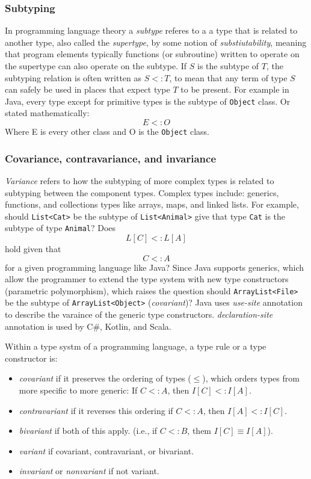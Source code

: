 \documentclass[a4paper]{article}
\begin{document}
\subsubsection*{Subtyping}

In programming language theory a \emph{subtype} referes to a a type that is related to another type, also called the 
\emph{supertype}, by some notion of \emph{substiutability}, meaning that program elements typically functions (or subroutine)
written to operate on the supertype can also operate on the subtype. If \(S\) is the subtype of \(T\), the subtyping relation
is often written as \(S <: T\), to mean that any term of type \(S\) can safely be used in places that expect type \(T\) to be
present. For example in Java, every type except for primitive types is the subtype of \lstinline{Object} class. Or stated
mathematically:
\[
E <: O  
\]
Where E is every other class and O is the \lstinline{Object} class. 

\subsubsection*{Covariance, contravariance, and invariance}
\emph{Variance} refers to how the subtyping of more complex types is related to subtyping between the component types.
Complex types include: generics, functions, and collections types like arrays, maps, and linked lists. For example, 
should \lstinline{List<Cat>} be the subtype of \lstinline{List<Animal>} give that type \lstinline{Cat} is the subtype of type \lstinline{Animal}? Does
\[L[C] <: L[A]\] hold given that \[C <: A\] for a given programming language like Java? Since Java supports generics, which
allow the programmer to extend the type system with new type constructors (parametric polymorphism), which raises the question
should \lstinline{ArrayList<File>} be the subtype of \lstinline{ArrayList<Object>} (\emph{covariant})? Java uses 
\emph{use-site}  annotation to describe the varaince of the generic type constructors. \emph{declaration-site} annotation is
used by C\#, Kotlin, and Scala. 

Within a type systm of a programming language, a type rule or a type constructor is:

\begin{itemize}
    \item \emph{covariant} if it preserves the ordering of types (\(\leq\)), which orders types from more specific to more
          generic: If \(C <: A\), then \(I[C] <: I[A]\).
    \item \emph{contravariant} if it reverses this ordering if \(C <: A\), then \(I[A] <: I[C]\).
    \item \emph{bivariant} if both of this apply. (i.e., if \(C <: B\), them \(I[C] \equiv I[A]\)).
    \item \emph{variant} if covariant, contravariant, or bivariant.
    \item \emph{invariant} or \emph{nonvariant} if not variant.
\end{itemize}
\end{document}
